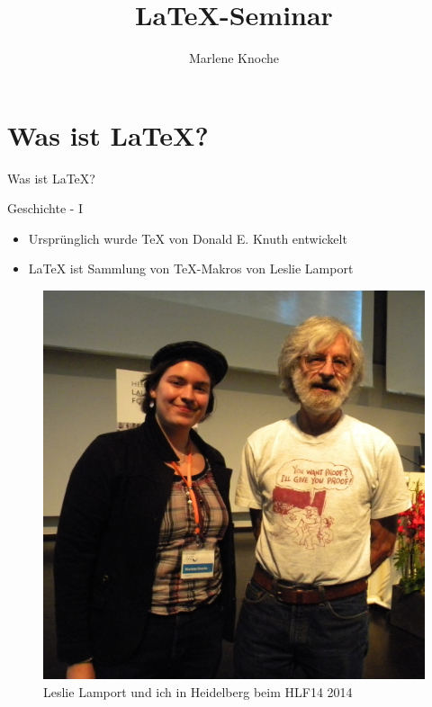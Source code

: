 \documentclass{beamer}
\author{Marlene Knoche}
\title{\LaTeX-Seminar}
\begin{document}
\begin{frame}

\maketitle

\end{frame}

\begin{frame}

\tableofcontents

\end{frame}

\section{Was ist \LaTeX?}

\begin{frame}
\centering
\huge{Was ist \LaTeX?}
\end{frame}

\begin{frame}{Geschichte - I}
\begin{itemize}
\item Ursprünglich wurde \TeX\; von Donald E. Knuth entwickelt
\item \LaTeX\; ist Sammlung von \TeX-Makros von Leslie Lamport 
\end{itemize}

\begin{figure}
\centering
\includegraphics[scale=0.5]{pics/leslielamport.jpg}
\caption{Leslie Lamport und ich in Heidelberg beim HLF14 2014}
\end{figure}
\end{frame}
\end{document}
